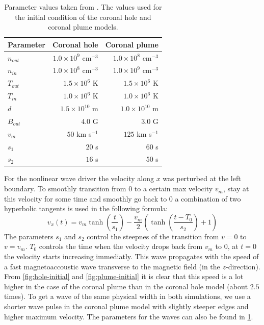 \begin{table}[H]
	\centering
	\begin{tabular}{|l|r|r|}
		\toprule
		Parameter & Coronal hole & Coronal plume\\
		\midrule
		$n_{out}$ & $1.0\times 10^9$ cm$^{-3}$ & $1.0\times 10^8$ cm$^{-3}$\\
		$n_{in}$ & $1.0\times 10^8$ cm$^{-3}$ & $1.0\times 10^9$ cm$^{-3}$\\
		$T_{out}$ & $1.5\times 10^6$ K & $1.5\times 10^6$ K\\
		$T_{in}$ & $1.0\times10^6$ K & $1.0\times10^6$ K\\
		$d$ & $1.5\times10^{10}$ m& $1.0\times10^{10}$ m \\
		$B_{out} $ & $4.0$ G & $3.0$ G\\
		\midrule
		$v_m$ & $50$ km s$^{-1}$ & $125$ km s$^{-1}$ \\
		$s_1$ & $20$ s & $60$ s \\
		$s_2$ & $16$ s& $50$ s\\
		\bottomrule
	\end{tabular}
	\caption{Parameter values taken from \cite{coronal-hole}. The values used for the initial condition of the coronal hole and coronal plume models.}
	\label{tab:parameters-hole}
\end{table}
For the nonlinear wave driver the velocity along $x$ was perturbed at the left boundary. 
To smoothly transition from $0$ to a certain max velocity $v_m$, stay at this velocity for some time and smoothly go back to $0$ a combination of two hyperbolic tangents is used in the following formula:
\begin{equation}
	v_x(t) = v_m \tanh \left( \frac{t}{s_1} \right) - \frac{v_m}{2} \left( \tanh \left( \frac{t-T_0}{s_2} \right) +1 \right) 
\end{equation}
The parameters $s_1$ and $s_2$ control the steepnes of the transition from $v=0$ to $v=v_m$.
$T_0$ controls the time when the velocity drops back from $v_m$ to $0$, at $t=0$ the velocity starts increasing immediatly.
This wave propagates with the speed of a fast magnetoaccoustic wave transverse to the magnetic field (in the $z$-direction).
From \cref{fig:hole-initial} and \cref{fig:plume-initial} it is clear that this speed is a lot higher in the case of the coronal plume than in the coronal hole model (about $2.5$ times).
To get a wave of the same physical width in both simulations, we use a shorter wave pulse in the coronal plume model with slightly steeper edges and higher maximum velocity.
The parameters for the waves can also be found in \cref{tab:parameters-hole}.

